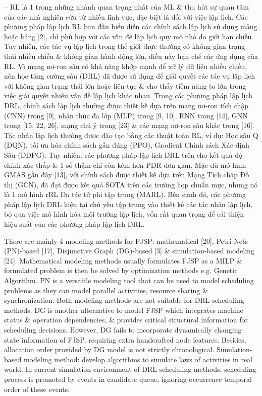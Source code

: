 \documentclass{article}
\begin{document}
\begin{itemize}
    -- RL là 1 trong những nhánh quan trọng nhất của ML \& thu hút sự quan tâm của các nhà nghiên cứu từ nhiều lĩnh vực, đặc biệt là đối với việc lập lịch. Các phương pháp lập lịch RL ban đầu biểu diễn các chính sách lập lịch sử dụng mảng hoặc bảng [2], chỉ phù hợp với các vấn đề lập lịch quy mô nhỏ do giới hạn chiều. Tuy nhiên, các tác vụ lập lịch trong thế giới thực thường có không gian trạng thái nhiều chiều \& không gian hành động lớn, điều này hạn chế các ứng dụng của RL. Vì mạng nơ-ron sâu có khả năng khớp mạnh để xử lý dữ liệu nhiều chiều, nên học tăng cường sâu (DRL) đã được sử dụng để giải quyết các tác vụ lập lịch với không gian trạng thái lớn hoặc liên tục \& cho thấy tiềm năng to lớn trong việc giải quyết nhiều vấn đề lập lịch khác nhau. Trong các phương pháp lập lịch DRL, chính sách lập lịch thường được thiết kế dựa trên mạng nơ-ron tích chập (CNN) trong [9], nhận thức đa lớp (MLP) trong [9, 10], RNN trong [14], GNN trong [15, 22, 26], mạng chú ý trong [23] \& các mạng nơ-ron sâu khác trong [16]. Tác nhân lập lịch thường được đào tạo bằng các thuật toán RL, ví dụ: Học sâu Q (DQN), tối ưu hóa chính sách gần đúng (PPO), Gradient Chính sách Xác định Sâu (DDPG). Tuy nhiên, các phương pháp lập lịch DRL trên cho kết quả độ chính xác thấp \& 1 số thậm chí còn kém hơn PDR đơn giản. Mặc dù mô hình GMAS gần đây [13], với chính sách được thiết kế dựa trên Mạng Tích chập Đồ thị (GCN), đã đạt được kết quả SOTA trên các trường hợp chuẩn mực, nhưng nó là 1 mô hình rRL Đa tác tử phi tập trung (MARL). Bên cạnh đó, các phương pháp lập lịch DRL hiện tại chủ yếu tập trung vào thiết kế các tác nhân lập lịch, bỏ qua việc mô hình hóa môi trường lập lịch, vốn rất quan trọng để cải thiện hiệu suất của các phương pháp lập lịch DRL.

    There are mainly 4 modeling methods for FJSP: mathematical [20], Petri Nets (PN)-based [17], Disjunctive Graph (DG)-based [3] \& simulation-based modeling [24]. Mathematical modeling methods usually formulates FJSP as a MILP \& formulated problem is then be solved by optimization methods e.g. Genetic Algorithm. PN is a versatile modeling tool that can be used to model scheduling problems as they can model parallel activities, resource sharing \& synchronization. Both modeling methods are not suitable for DRL scheduling methods. DG is another alternative to model FJSP which integrates machine status \& operation dependencies, \& provides critical structural information for scheduling decisions. However, DG fails to incorporate dynamically changing state information of FJSP, requiring extra handcrafted node features. Besides, allocation order provided by DG model is not strictly chronological. Simulation-based modeling method: develop algorithms to simulate laws of activities in real world. In current simulation environment of DRL scheduling methods, scheduling process is promoted by events in candidate queue, ignoring occurrence temporal order of these events.


\end{itemize}
\end{document}
